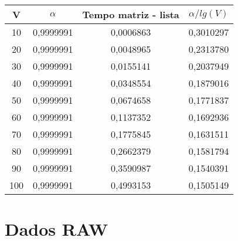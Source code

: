 \documentclass[brazil,times]{abnt}
\begin{document}
\begin{tabular}{|c|c|c|c|}
\hline
V  &  $\alpha$  &  Tempo matriz - lista  &  $\alpha/lg(V)$ \\ \hline
10  &  0,9999991  &  0,0006863  &  0,3010297 \\ \hline
20  &  0,9999991  &  0,0048965  &  0,2313780 \\ \hline
30  &  0,9999991  &  0,0155141  &  0,2037949 \\ \hline
40  &  0,9999991  &  0,0348554  &  0,1879016 \\ \hline
50  &  0,9999991  &  0,0674658  &  0,1771837 \\ \hline
60  &  0,9999991  &  0,1137352  &  0,1692936 \\ \hline
70  &  0,9999991  &  0,1775845  &  0,1631511 \\ \hline
80  &  0,9999991  &  0,2662379  &  0,1581794 \\ \hline
90  &  0,9999991  &  0,3590987  &  0,1540391 \\ \hline
100 &  0,9999991  &  0,4993153  &  0,1505149 \\ \hline
\end{tabular}

\section*{Dados RAW}
\end{document}
